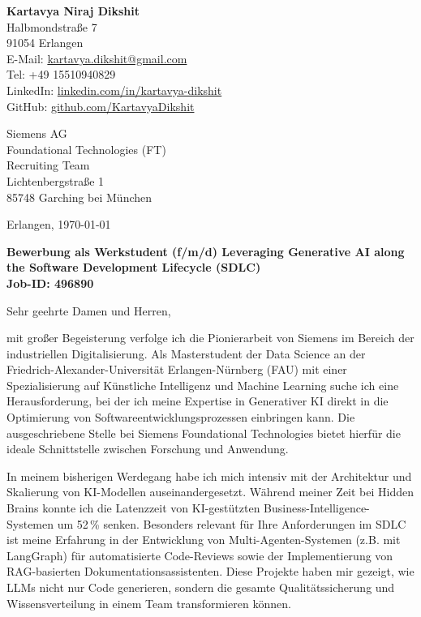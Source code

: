 \documentclass[10pt, a4paper]{article}
\begin{document}
\noindent
\textbf{\large \color{primarycolor} Kartavya Niraj Dikshit} \\
Halbmondstraße 7 \\
91054 Erlangen \\
E-Mail: \href{mailto:kartavya.dikshit@gmail.com}{kartavya.dikshit@gmail.com} \\
Tel: +49 15510940829 \\
LinkedIn: \href{http://www.linkedin.com/in/kartavya-dikshit}{linkedin.com/in/kartavya-dikshit} \\
GitHub: \href{https://github.com/KartavyaDikshit}{github.com/KartavyaDikshit}

\vspace{1.5cm}

\noindent
Siemens AG \\
Foundational Technologies (FT) \\
Recruiting Team \\
Lichtenbergstraße 1 \\
85748 Garching bei München

\hfill Erlangen, \today

\vspace{1cm}

\noindent
\textbf{\large \color{primarycolor} Bewerbung als Werkstudent (f/m/d) Leveraging Generative AI along the Software Development Lifecycle (SDLC)} \\
\textbf{Job-ID: 496890}

\vspace{0.8cm}

\noindent
Sehr geehrte Damen und Herren,

\vspace{0.4cm}

\noindent
mit großer Begeisterung verfolge ich die Pionierarbeit von Siemens im Bereich der industriellen Digitalisierung. Als Masterstudent der Data Science an der Friedrich-Alexander-Universität Erlangen-Nürnberg (FAU) mit einer Spezialisierung auf Künstliche Intelligenz und Machine Learning suche ich eine Herausforderung, bei der ich meine Expertise in Generativer KI direkt in die Optimierung von Softwareentwicklungsprozessen einbringen kann. Die ausgeschriebene Stelle bei Siemens Foundational Technologies bietet hierfür die ideale Schnittstelle zwischen Forschung und Anwendung.

\vspace{0.3cm}
\noindent
In meinem bisherigen Werdegang habe ich mich intensiv mit der Architektur und Skalierung von KI-Modellen auseinandergesetzt. Während meiner Zeit bei Hidden Brains konnte ich die Latenzzeit von KI-gestützten Business-Intelligence-Systemen um 52\,\% senken. Besonders relevant für Ihre Anforderungen im SDLC ist meine Erfahrung in der Entwicklung von Multi-Agenten-Systemen (z.B. mit LangGraph) für automatisierte Code-Reviews sowie der Implementierung von RAG-basierten Dokumentationsassistenten. Diese Projekte haben mir gezeigt, wie LLMs nicht nur Code generieren, sondern die gesamte Qualitätssicherung und Wissensverteilung in einem Team transformieren können.
\end{document}

